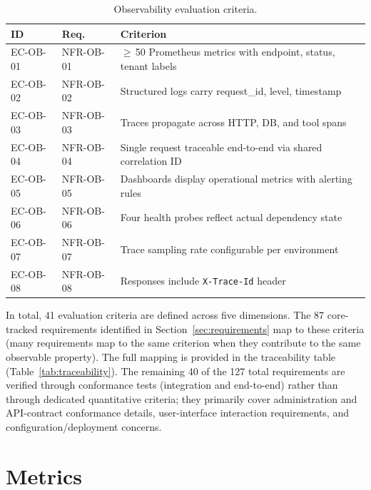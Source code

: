 \documentclass[a4paper]{sapthesis}
\begin{document}
\begin{table}[ht]
\centering
\caption{Observability evaluation criteria.}
\label{tab:ec-ob}
\small
\begin{tabularx}{\textwidth}{@{}l l X@{}}
    \hline
    \textbf{ID} & \textbf{Req.} & \textbf{Criterion} \\
    \hline
    EC-OB-01 & NFR-OB-01 & $\geq$\,50 Prometheus metrics with endpoint,
        status, tenant labels \\
    EC-OB-02 & NFR-OB-02 & Structured logs carry request\_id, level,
        timestamp \\
    EC-OB-03 & NFR-OB-03 & Traces propagate across HTTP, DB, and tool
        spans \\
    EC-OB-04 & NFR-OB-04 & Single request traceable end-to-end via
        shared correlation ID \\
    EC-OB-05 & NFR-OB-05 & Dashboards display operational metrics with
        alerting rules \\
    EC-OB-06 & NFR-OB-06 & Four health probes reflect actual dependency
        state \\
    EC-OB-07 & NFR-OB-07 & Trace sampling rate configurable per
        environment \\
    EC-OB-08 & NFR-OB-08 & Responses include \texttt{X-Trace-Id}
        header \\
    \hline
\end{tabularx}
\end{table}

\medskip
In total, 41 evaluation criteria are defined across five dimensions.
The 87 core-tracked requirements identified in
Section~\ref{sec:requirements} map to these criteria (many requirements
map to the same criterion when they contribute to the same observable
property).  The full mapping is provided in the traceability table
(Table~\ref{tab:traceability}).  The remaining 40 of the 127 total requirements are verified through
conformance tests (integration and end-to-end) rather than through
dedicated quantitative criteria; they primarily cover administration and
API-contract conformance details, user-interface interaction
requirements, and configuration/deployment concerns.


\section{Metrics}
\label{sec:metrics}
\end{document}
